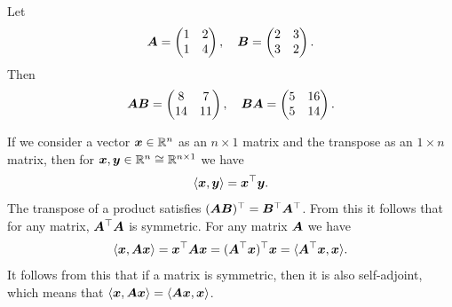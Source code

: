 \documentclass[11pt,a4paper]{memoir}
\begin{document}
\begin{example}
Let 
\begin{equation*}
\bm{A} = \begin{pmatrix}
 1 & 2\\
 1 & 4
 \end{pmatrix}, \quad
 \bm{B}=\begin{pmatrix}
 2 & 3\\
 3 & 2
 \end{pmatrix}.
 \end{equation*}
 Then
 \begin{equation*}
 \bm{A}\bm{B} = \begin{pmatrix}
8 & 7\\
14 & 11
\end{pmatrix}, \quad \bm{B}\bm{A} = \begin{pmatrix}
5 & 16\\
5 & 14
\end{pmatrix}.
\end{equation*}
\end{example}

If we consider a vector $\bm{x}\in \mathbb{R}^n$ as an $n\times 1$ matrix and the transpose as an $1\times n$ matrix, then for $\bm{x},\bm{y}\in \mathbb{R}^n\cong \mathbb{R}^{n\times 1}$ we have
\begin{equation*}
 \langle {\bm{x}}, {\bm{y}} \rangle = \bm{x}^{\top} \bm{y}.
\end{equation*}
The transpose of a product satisfies $(\bm{A}\bm{B})^{\top} = \bm{B}^{\top}\bm{A}^{\top}$. From this it follows that for any matrix, $\bm{A}^{\top}\bm{A}$ is symmetric. For any matrix $\bm{A}$ we have
\begin{equation*}
 \langle {\bm{x}}, {\bm{A}\bm{x}} \rangle = \bm{x}^{\top}\bm{A}\bm{x} = (\bm{A}^{\top}\bm{x})^{\top}\bm{x} = \langle {\bm{A}^{\top}\bm{x}}, {\bm{x}} \rangle.
\end{equation*}
It follows from this that if a matrix is symmetric, then it is also self-adjoint, which means that $\langle {\bm{x}}, {\bm{A}\bm{x}} \rangle = \langle {\bm{A}\bm{x}}, {\bm{x}} \rangle$.
\end{document}
